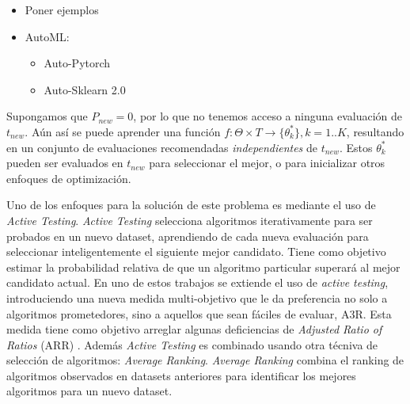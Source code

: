 \begin{itemize}
	\item Poner ejemplos
		\item AutoML: \begin{itemize}
			\item Auto-Pytorch
			\item Auto-Sklearn 2.0
		\end{itemize}
\end{itemize}

Supongamos que $P_{new} = 0$, por lo que no tenemos acceso a ninguna evaluación de $t_{new}$. Aún así se puede aprender una función $f: \Theta \times T \rightarrow \{\theta^*_k\}, k=1..K$, resultando en un conjunto de evaluaciones recomendadas \textit{independientes} de $t_{new}$. Estos $\theta^*_k$ pueden ser evaluados en $t_{new}$ para seleccionar el mejor, o para inicializar otros enfoques de optimización.

Uno de los enfoques para la solución de este problema es mediante el uso de \textit{Active Testing}\cite{leite2017selecting}. \textit{Active Testing} selecciona algoritmos iterativamente para ser probados en un nuevo dataset, aprendiendo de cada nueva evaluación para seleccionar inteligentemente el siguiente mejor candidato. Tiene como objetivo estimar la probabilidad relativa de que un algoritmo particular superará al mejor candidato actual. En uno de estos trabajos \cite{abdulrahman2018speeding} se extiende el uso de \textit{active testing}, introduciendo una nueva medida multi-objetivo que le da preferencia no solo a algoritmos prometedores, sino a aquellos que sean fáciles de evaluar, A3R. Esta medida tiene como objetivo arreglar algunas deficiencias de \textit{Adjusted Ratio of Ratios} (ARR) \cite{abdulrahman2014measures}. Además \textit{Active Testing} es combinado usando otra técniva de selección de algoritmos: \textit{Average Ranking}. \textit{Average Ranking} combina el ranking de algoritmos observados en datasets anteriores para identificar los mejores algoritmos para un nuevo dataset.

